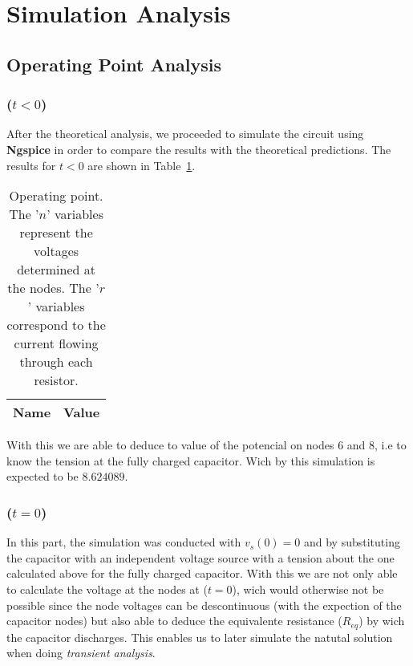\newpage

\section{Simulation Analysis}
\label{sec:simulation}

\subsection{Operating Point Analysis}
\label{sec:op_point}

\subsubsection{($t < 0$)}

After the theoretical analysis, we proceeded to simulate the circuit using {\bf Ngspice} in order to compare the results with the theoretical predictions. The results for $t < 0$ are shown in Table~\ref{tab:op1}.

\begin{table}[H]
	\centering
	\begin{tabular}{|l|c|}
		\hline    
		    {\bf Name} & {\bf Value} \\
                    \hline
                    \hline
		
	\end{tabular}
	\caption{Operating point. The '$n$' variables represent the voltages determined at the nodes. The '$r$' variables correspond to the current flowing through each resistor.}
	\label{tab:op1}
\end{table}

\par With this we are able to deduce to value of the potencial on nodes 6 and 8, i.e to know the tension at the fully charged capacitor. Wich by this simulation is expected to be $8.624089$.

\subsubsection{($t = 0$)}

In this part, the simulation was conducted with $v_s(0) = 0$ and by substituting the capacitor with an independent voltage source with a tension about the one calculated above for the fully charged capacitor. With this we are not only able to calculate the voltage at the nodes at ($t = 0$), wich would otherwise not be possible since the node voltages can be descontinuous (with the expection of the capacitor nodes) but also able to deduce the equivalente resistance ($R_{eq}$) by wich the capacitor discharges. This enables us to later simulate the natutal solution when doing \emph{transient analysis}.

